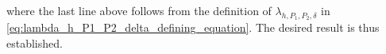 where the last line above follows from the definition of $\lambda_{h, P_1, P_2, \delta}$ in \eqref{eq:lambda_h_P1_P2_delta_defining_equation}.
The desired result is thus established.

